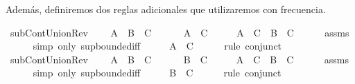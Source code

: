 \begin{isabellebody}
\begin{isamarkuptext}
  Además, definiremos dos reglas adicionales que utilizaremos con 
  frecuencia.%
\end{isamarkuptext}\isamarkuptrue%
\isamarkupfalse%
\ subContUnionRev{}{\isacharcolon}\ \isanewline
\ \ \ {\isachardoublequoteopen}A\ {\isasymunion}\ B\ {\isasymsubseteq}\ C{\isachardoublequoteclose}\ \isanewline
\ \ \ \ \ {\isachardoublequoteopen}A\ {\isasymsubseteq}\ C{\isachardoublequoteclose}\isanewline
%
\isadelimproof
%
\endisadelimproof
%
\isatagproof
{}\isamarkupfalse%
\ {\isacharminus}\isanewline
\ \ \isamarkupfalse%
\ {\isachardoublequoteopen}A\ {\isasymsubseteq}\ C\ {\isasymand}\ B\ {\isasymsubseteq}\ C{\isachardoublequoteclose}\isanewline
\ \ \ \ \isamarkupfalse%
\ assms\isanewline
\ \ \ \ \isamarkupfalse%
\ {\isacharparenleft}simp\ only{\isacharcolon}\ sup{\isachardot}bounded{\isacharunderscore}iff{\isacharparenright}\isanewline
\ \ \isamarkupfalse%
\ \isamarkupfalse%
\ {\isachardoublequoteopen}A\ {\isasymsubseteq}\ C{\isachardoublequoteclose}\isanewline
\ \ \ \ \isamarkupfalse%
\ {\isacharparenleft}rule\ conjunct{}{\isacharparenright}\isanewline
{}\isamarkupfalse%
%
\endisatagproof
{\isafoldproof}%
%
\isadelimproof
\isanewline
%
\endisadelimproof
\isanewline
{}\isamarkupfalse%
\ subContUnionRev{}{\isacharcolon}\ \isanewline
\ \ \ {\isachardoublequoteopen}A\ {\isasymunion}\ B\ {\isasymsubseteq}\ C{\isachardoublequoteclose}\ \isanewline
\ \ \ \ \ {\isachardoublequoteopen}B\ {\isasymsubseteq}\ C{\isachardoublequoteclose}\isanewline
%
\isadelimproof
%
\endisadelimproof
%
\isatagproof
{}\isamarkupfalse%
\ {\isacharminus}\isanewline
\ \ \isamarkupfalse%
\ {\isachardoublequoteopen}A\ {\isasymsubseteq}\ C\ {\isasymand}\ B\ {\isasymsubseteq}\ C{\isachardoublequoteclose}\isanewline
\ \ \ \ \isamarkupfalse%
\ assms\isanewline
\ \ \ \ \isamarkupfalse%
\ {\isacharparenleft}simp\ only{\isacharcolon}\ sup{\isachardot}bounded{\isacharunderscore}iff{\isacharparenright}\isanewline
\ \ \isamarkupfalse%
\ \isamarkupfalse%
\ {\isachardoublequoteopen}B\ {\isasymsubseteq}\ C{\isachardoublequoteclose}\isanewline
\ \ \ \ \isamarkupfalse%
\ {\isacharparenleft}rule\ conjunct{}{\isacharparenright}\isanewline
{}\isamarkupfalse%
%
\endisatagproof

\end{isabellebody}
